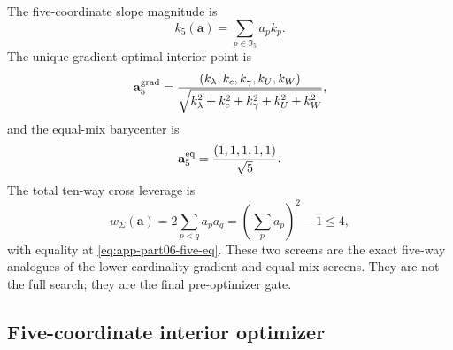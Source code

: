 The five-coordinate slope magnitude is
\begin{equation}
\label{eq:app-part06-five-slope}
k_5(\mathbf a)=\sum_{p\in\mathfrak I_5}a_pk_p.
\end{equation}
The unique gradient-optimal interior point is
\begin{equation}
\label{eq:app-part06-five-grad}
\mathbf a_5^{\rm grad}
=
\frac{(k_\lambda,k_c,k_\gamma,k_U,k_W)}{\sqrt{k_\lambda^2+k_c^2+k_\gamma^2+k_U^2+k_W^2}},
\end{equation}
and the equal-mix barycenter is
\begin{equation}
\label{eq:app-part06-five-eq}
\mathbf a_5^{\rm eq}=\frac{(1,1,1,1,1)}{\sqrt5}.
\end{equation}
The total ten-way cross leverage is
\begin{equation}
\label{eq:app-part06-five-cross-leverage}
w_\Sigma(\mathbf a)=2\sum_{p<q}a_pa_q=\left(\sum_pa_p\right)^2-1\le4,
\end{equation}
with equality at \eqref{eq:app-part06-five-eq}.  These two screens are the exact five-way analogues of the lower-cardinality gradient and equal-mix screens.  They are not the full search; they are the final pre-optimizer gate.

\subsection{Five-coordinate interior optimizer}
\label{subsec:app-part06-five-coordinate-interior-optimizer}


